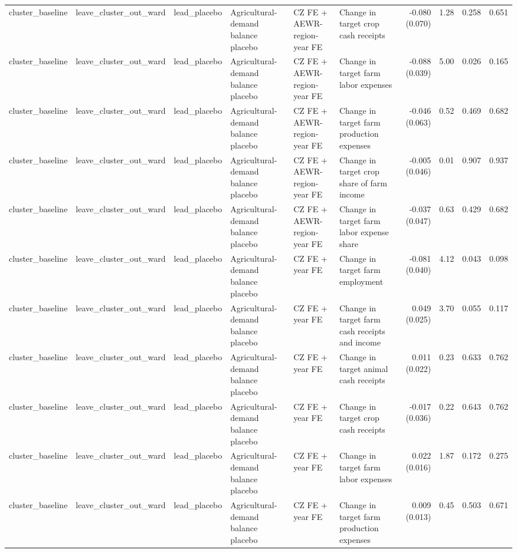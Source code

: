 \begin{tabular}{llllllrrrr}
cluster_baseline & leave_cluster_out_ward & lead_placebo & Agricultural-demand balance placebo & CZ FE + AEWR-region-year FE & Change in target crop cash receipts & -0.080 (0.070) & 1.28 & 0.258 & 0.651 \\
cluster_baseline & leave_cluster_out_ward & lead_placebo & Agricultural-demand balance placebo & CZ FE + AEWR-region-year FE & Change in target farm labor expenses & -0.088 (0.039) & 5.00 & 0.026 & 0.165 \\
cluster_baseline & leave_cluster_out_ward & lead_placebo & Agricultural-demand balance placebo & CZ FE + AEWR-region-year FE & Change in target farm production expenses & -0.046 (0.063) & 0.52 & 0.469 & 0.682 \\
cluster_baseline & leave_cluster_out_ward & lead_placebo & Agricultural-demand balance placebo & CZ FE + AEWR-region-year FE & Change in target crop share of farm income & -0.005 (0.046) & 0.01 & 0.907 & 0.937 \\
cluster_baseline & leave_cluster_out_ward & lead_placebo & Agricultural-demand balance placebo & CZ FE + AEWR-region-year FE & Change in target farm labor expense share & -0.037 (0.047) & 0.63 & 0.429 & 0.682 \\
cluster_baseline & leave_cluster_out_ward & lead_placebo & Agricultural-demand balance placebo & CZ FE + year FE & Change in target farm employment & -0.081 (0.040) & 4.12 & 0.043 & 0.098 \\
cluster_baseline & leave_cluster_out_ward & lead_placebo & Agricultural-demand balance placebo & CZ FE + year FE & Change in target farm cash receipts and income & 0.049 (0.025) & 3.70 & 0.055 & 0.117 \\
cluster_baseline & leave_cluster_out_ward & lead_placebo & Agricultural-demand balance placebo & CZ FE + year FE & Change in target animal cash receipts & 0.011 (0.022) & 0.23 & 0.633 & 0.762 \\
cluster_baseline & leave_cluster_out_ward & lead_placebo & Agricultural-demand balance placebo & CZ FE + year FE & Change in target crop cash receipts & -0.017 (0.036) & 0.22 & 0.643 & 0.762 \\
cluster_baseline & leave_cluster_out_ward & lead_placebo & Agricultural-demand balance placebo & CZ FE + year FE & Change in target farm labor expenses & 0.022 (0.016) & 1.87 & 0.172 & 0.275 \\
cluster_baseline & leave_cluster_out_ward & lead_placebo & Agricultural-demand balance placebo & CZ FE + year FE & Change in target farm production expenses & 0.009 (0.013) & 0.45 & 0.503 & 0.671 \\

\end{tabular}
